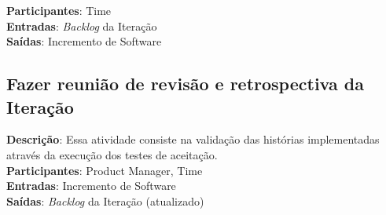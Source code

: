   \textbf{Participantes}: Time\\
  
  \textbf{Entradas}: \textit{Backlog} da Iteração \\
  
  \textbf{Saídas}:   Incremento de Software\\
  
\subsection{Fazer reunião de revisão e retrospectiva da Iteração}
  \textbf{Descrição}: Essa atividade consiste na validação das histórias implementadas através da execução dos testes de aceitação. \\
  
  \textbf{Participantes}: Product Manager, Time\\
  
  \textbf{Entradas}: Incremento de Software \\
  
  \textbf{Saídas}:   \textit{Backlog} da Iteração (atualizado)\\
